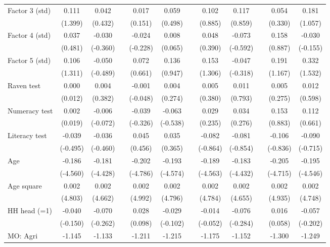 {\begin{longtable}{@{\extracolsep{\fill}}lccccccccccc}
    Factor 3 (std) & 0.111 & 0.042 &   & 0.017 & 0.059 &   & 0.102 & 0.117 &   & 0.054 & 0.181 \\
      & (1.399) & (0.432) &   & (0.151) & (0.498) &   & (0.885) & (0.859) &   & (0.330) & (1.057) \\
    Factor 4 (std) & 0.037 & -0.030 &   & -0.024 & 0.008 &   & 0.048 & -0.073 &   & 0.158 & -0.030 \\
      & (0.481) & (-0.360) &   & (-0.228) & (0.065) &   & (0.390) & (-0.592) &   & (0.887) & (-0.155) \\
    Factor 5 (std) & 0.106 & -0.050 &   & 0.072 & 0.136 &   & 0.153 & -0.047 &   & 0.191 & 0.332 \\
      & (1.311) & (-0.489) &   & (0.661) & (0.947) &   & (1.306) & (-0.318) &   & (1.167) & (1.532) \\
    Raven test & 0.000 & 0.004 &   & -0.001 & 0.004 &   & 0.005 & 0.011 &   & 0.005 & 0.012 \\
      & (0.012) & (0.382) &   & (-0.048) & (0.274) &   & (0.380) & (0.793) &   & (0.275) & (0.598) \\
    Numeracy test & 0.002 & -0.006 &   & -0.039 & -0.063 &   & 0.029 & 0.034 &   & 0.153 & 0.112 \\
      & (0.019) & (-0.072) &   & (-0.326) & (-0.538) &   & (0.235) & (0.276) &   & (0.883) & (0.661) \\
    Literacy test & -0.039 & -0.036 &   & 0.045 & 0.035 &   & -0.082 & -0.081 &   & -0.106 & -0.090 \\
      & (-0.495) & (-0.460) &   & (0.456) & (0.365) &   & (-0.864) & (-0.854) &   & (-0.836) & (-0.715) \\
    Age & -0.186 & -0.181 &   & -0.202 & -0.193 &   & -0.189 & -0.183 &   & -0.205 & -0.195 \\
      & (-4.560) & (-4.428) &   & (-4.786) & (-4.574) &   & (-4.563) & (-4.432) &   & (-4.715) & (-4.546) \\
    Age square & 0.002 & 0.002 &   & 0.002 & 0.002 &   & 0.002 & 0.002 &   & 0.002 & 0.002 \\
      & (4.803) & (4.662) &   & (4.992) & (4.796) &   & (4.784) & (4.655) &   & (4.935) & (4.748) \\
    HH head (=1) & -0.040 & -0.070 &   & 0.028 & -0.029 &   & -0.014 & -0.076 &   & 0.016 & -0.057 \\
      & (-0.150) & (-0.262) &   & (0.098) & (-0.102) &   & (-0.052) & (-0.284) &   & (0.058) & (-0.202) \\
    MO: Agri & -1.145 & -1.133 &   & -1.211 & -1.215 &   & -1.175 & -1.152 &   & -1.300 & -1.249 \\

\end{longtable}}
